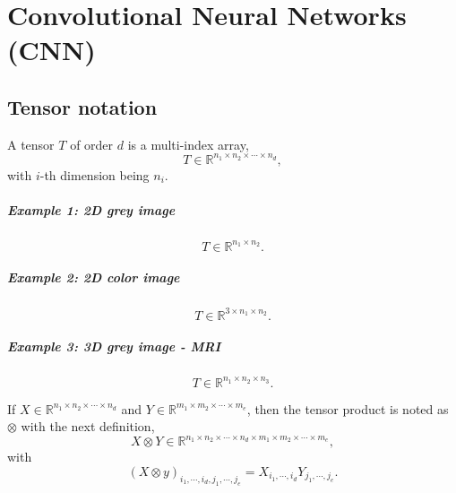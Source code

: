 \chapter{Convolutional Neural Networks (CNN)}
\section{Tensor notation}
\begin{definition}
A tensor $T$ of order $d$  is a multi-index array,
\begin{equation}
T \in \mathbb R^{n_1 \times n_2 \times \cdots \times n_d},
\end{equation}
with $i$-th dimension being $n_i$. 
\end{definition}
\paragraph{Example 1: 2D grey image}
\begin{equation}\label{2DGreyImage}
T \in \mathbb{R}^{n_1 \times n_2}.
\end{equation}
\paragraph{Example 2: 2D color image}
\begin{equation}\label{2DColorImage}
T \in \mathbb{R}^{3 \times n_1 \times n_2}.
\end{equation}
\paragraph{Example 3: 3D grey image - MRI}
\begin{equation}\label{3DColorImage}
T \in \mathbb{R}^{ n_1 \times n_2 \times n_3}.
\end{equation}

\begin{definition}
If $X \in \mathbb R^{n_1 \times n_2 \times \cdots \times n_d}$ and $Y \in \mathbb R^{m_1 \times m_2 \times \cdots \times m_e}$, then the tensor product is noted as $\otimes$ with the next definition, 
\begin{equation}
X \otimes Y \in \mathbb R^{n_1 \times n_2 \times \cdots \times n_d \times m_1 \times m_2 \times \cdots \times m_e},
\end{equation}
with 
\begin{equation}
(X\otimes y)_{i_1, \cdots, i_d, j_1, \cdots,j_e} = X_{i_1, \cdots, i_d} Y_{j_1, \cdots, j_e}.
\end{equation}
\end{definition}
